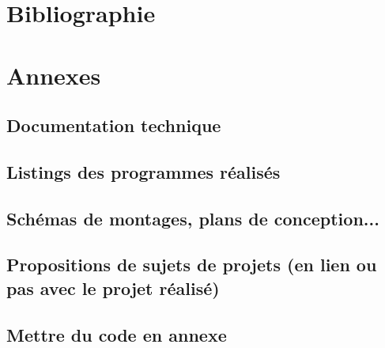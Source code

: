 \documentclass[a4paper, 12pt]{report} %
\begin{document}

\newpage

\renewcommand{\notesname}{} %
\chapter*{Bibliographie}
\makeatletter
\renewcommand{\enoteheading}{\par\vspace{1 em}}
\renewcommand{\theenmark}{\makebox[0.5 em][r]{\@theenmark}}
\renewcommand{\enoteformat}{\parindent = 2 em
  							\leftskip = 0.5 em
  							[\theenmark]\enspace\ignorespaces}							
\makeatother
\theendnotes


\newpage
\chapter*{Annexes}
\renewcommand{\thesection}{\Alph{section}}  %
\setcounter{section}{0} %

\section{Documentation technique}
\newpage

\section{Listings des programmes réalisés}
\newpage

\section{Schémas de montages, plans de conception...}
\newpage

\section{Propositions de sujets de projets (en lien ou pas avec le projet réalisé)}
\newpage

\section{Mettre du code en annexe}
\end{document}
